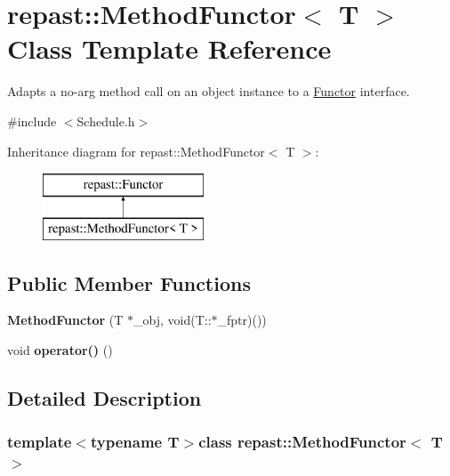 \hypertarget{classrepast_1_1_method_functor}{\section{repast\-:\-:Method\-Functor$<$ T $>$ Class Template Reference}
\label{classrepast_1_1_method_functor}
}


Adapts a no-\/arg method call on an object instance to a \hyperlink{classrepast_1_1_functor}{Functor} interface.  




{\ttfamily \#include $<$Schedule.\-h$>$}

Inheritance diagram for repast\-:\-:Method\-Functor$<$ T $>$\-:\begin{figure}[H]
\begin{center}
\leavevmode
\includegraphics[height=2.000000cm]{classrepast_1_1_method_functor}
\end{center}
\end{figure}
\subsection*{Public Member Functions}
\begin{DoxyCompactItemize}
\item 
\hypertarget{classrepast_1_1_method_functor_aea76fb8700d36f0978cd3b5efa995bb3}{{\bfseries Method\-Functor} (T $\ast$\-\_\-obj, void(T\-::$\ast$\-\_\-fptr)())}\label{classrepast_1_1_method_functor_aea76fb8700d36f0978cd3b5efa995bb3}

\item 
\hypertarget{classrepast_1_1_method_functor_ab335eb6d9a05e2a470dab88d5e573823}{void {\bfseries operator()} ()}\label{classrepast_1_1_method_functor_ab335eb6d9a05e2a470dab88d5e573823}

\end{DoxyCompactItemize}


\subsection{Detailed Description}
\subsubsection*{template$<$typename T$>$class repast\-::\-Method\-Functor$<$ T $>$}

